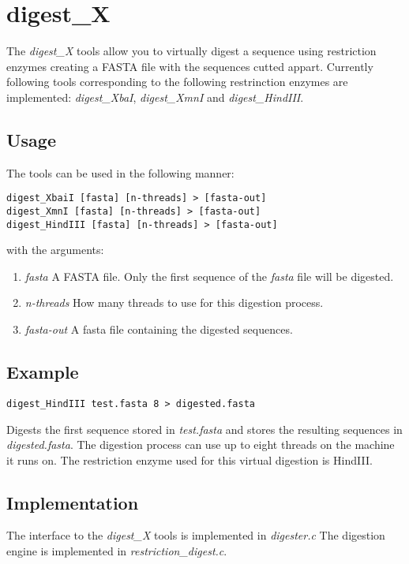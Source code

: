 \section{digest\_X}

The \emph{digest\_X} tools allow you to virtually digest a sequence
using restriction enzymes creating a FASTA file with the sequences
cutted appart. Currently following tools corresponding to the following
restrinction enzymes are implemented: \emph{digest\_XbaI}, \emph{digest\_XmnI}
and \emph{digest\_HindIII}. 

\subsection{Usage}
The tools can be used in the following manner:
\begin{lstlisting}
digest_XbaiI [fasta] [n-threads] > [fasta-out]
digest_XmnI [fasta] [n-threads] > [fasta-out]
digest_HindIII [fasta] [n-threads] > [fasta-out]
\end{lstlisting}
with the arguments:
\begin{enumerate}
\item \emph{fasta} A FASTA file. Only the first sequence of the \emph{fasta}
  file will be digested.
\item \emph{n-threads} How many threads to use for this digestion process.
\item \emph{fasta-out} A fasta file containing the digested sequences.
\end{enumerate}

\subsection{Example}
\begin{lstlisting}
digest_HindIII test.fasta 8 > digested.fasta
\end{lstlisting}
Digests the first sequence stored in \emph{test.fasta} and stores the resulting
sequences in \emph{digested.fasta}. The digestion process can use up to eight
threads on the machine it runs on. The restriction enzyme used for this
virtual digestion is HindIII. 

\subsection{Implementation}
The interface to the \emph{digest\_X} tools is implemented in \emph{digester.c}
The digestion engine is implemented in \emph{restriction\_digest.c}. 
